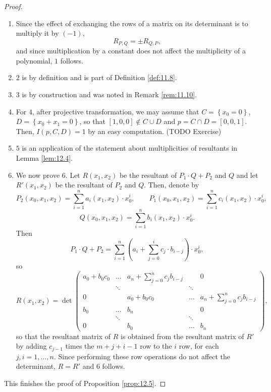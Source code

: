 \documentclass{article}
\newcommand{\rb}[1]{\left( #1 \right)}
\renewcommand{\sb}[1]{\left[ #1 \right]}
\newcommand{\cb}[1]{\left\{ #1 \right\}}
\theoremstyle{definition}\newtheorem{definition}{Definition}[section]
\theoremstyle{definition}\newtheorem{notation}[definition]{Notation}
\theoremstyle{definition}\newtheorem{remark}[definition]{Remark}
\theoremstyle{definition}\newtheorem{example}[definition]{Example}
\theoremstyle{definition}\newtheorem{fact}{Fact}
\theoremstyle{definition}\newtheorem{exercise}{Exercise}
\begin{document}
\begin{proof}
\hfill
\begin{enumerate}
\item Since the effect of exchanging the rows of a matrix on its determinant is to multiply it by $ \rb{-1} $,
$$ R_{P, Q} = \pm R_{Q, P}, $$
and since multiplication by a constant does not affect the multiplicity of a polynomial, $ 1 $ follows.
\item $ 2 $ is by definition and is part of Definition \ref{def:11.8}.
\item $ 3 $ is by construction and was noted in Remark \ref{rem:11.10}.
\item For $ 4 $, after projective transformation, we may assume that $ C = \cb{x_0 = 0} $, $ D = \cb{x_0 + x_1 = 0} $, so that $ \sb{1, 0, 0} \notin C \cup D $ and $ p = C \cap D = \sb{0, 0, 1} $. Then, $ I\rb{p, C, D} = 1 $ by an easy computation. (TODO Exercise)
\item $ 5 $ is an application of the statement about multiplicities of resultants in Lemma \ref{lem:12.4}.
\item We now prove $ 6 $. Let $ R\rb{x_1, x_2} $ be the resultant of $ P_1 \cdot Q + P_2 $ and $ Q $ and let $ R'\rb{x_1, x_2} $ be the resultant of $ P_2 $ and $ Q $. Then, denote by
$$ P_2\rb{x_0, x_1, x_2} = \sum_{i = 1}^n a_i\rb{x_1, x_2} \cdot x_0^i, \qquad P_1\rb{x_0, x_1, x_2} = \sum_{i = 1}^n c_i\rb{x_1, x_2} \cdot x_0^i, $$
$$ Q\rb{x_0, x_1, x_2} = \sum_{i = 1}^n b_i\rb{x_1, x_2} \cdot x_0^i. $$
Then
$$ P_1 \cdot Q + P_2 = \sum_{i = 1}^n \rb{a_i + \sum_{j = 0}^i c_j \cdot b_{i - j}} \cdot x_0^i, $$
so
$$ R\rb{x_1, x_2} = \det\begin{pmatrix} a_0 + b_0c_0 & \dots & a_n + \sum_{j = 0}^n c_jb_{i - j} & & 0 \\ & \ddots & & \ddots & \\ 0 & & a_0 + b_0c_0 & \dots & a_n + \sum_{j = 0}^n c_jb_{i - j} \\ b_0 & \dots & b_n & & 0 \\ & \ddots & & \ddots & \\ 0 & & b_0 & \dots & b_n \end{pmatrix}, $$
so that the resultant matrix of $ R $ is obtained from the resultant matrix of $ R' $ by adding $ c_{j - 1} $ times the $ m + j + i - 1 $ row to the $ i $ row, for each $ j, i = 1, \dots, n $. Since performing these row operations do not affect the determinant, $ R = R' $ and $ 6 $ follows.
\end{enumerate}
This finishes the proof of Proposition \ref{prop:12.5}.
\end{proof}
\end{document}
